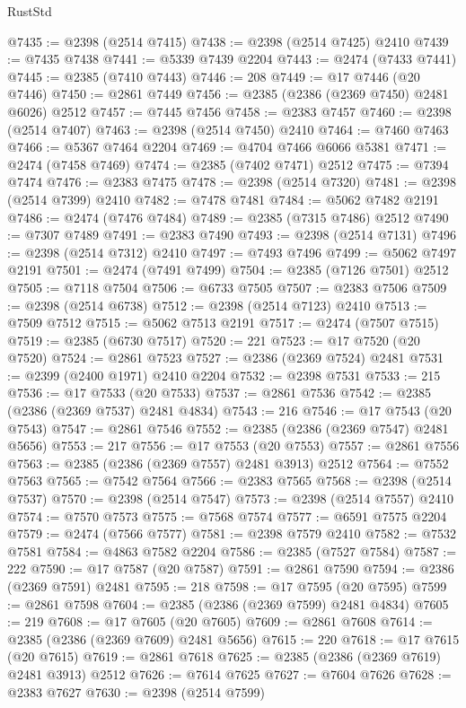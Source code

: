 \begin{lexlean}{RustStd}
\begin{coremodule}
@7435 := @2398 (@2514 @7415)
@7438 := @2398 (@2514 @7425) @2410
@7439 := @7435 @7438
@7441 := @5339 @7439 @2204
@7443 := @2474 (@7433 @7441)
@7445 := @2385 (@7410 @7443)
@7446 := 208
@7449 := @17 @7446 (@20 @7446)
@7450 := @2861 @7449
@7456 := @2385 (@2386 (@2369 @7450) @2481 @6026) @2512
@7457 := @7445 @7456
@7458 := @2383 @7457
@7460 := @2398 (@2514 @7407)
@7463 := @2398 (@2514 @7450) @2410
@7464 := @7460 @7463
@7466 := @5367 @7464 @2204
@7469 := @4704 @7466 @6066 @5381
@7471 := @2474 (@7458 @7469)
@7474 := @2385 (@7402 @7471) @2512
@7475 := @7394 @7474
@7476 := @2383 @7475
@7478 := @2398 (@2514 @7320)
@7481 := @2398 (@2514 @7399) @2410
@7482 := @7478 @7481
@7484 := @5062 @7482 @2191
@7486 := @2474 (@7476 @7484)
@7489 := @2385 (@7315 @7486) @2512
@7490 := @7307 @7489
@7491 := @2383 @7490
@7493 := @2398 (@2514 @7131)
@7496 := @2398 (@2514 @7312) @2410
@7497 := @7493 @7496
@7499 := @5062 @7497 @2191
@7501 := @2474 (@7491 @7499)
@7504 := @2385 (@7126 @7501) @2512
@7505 := @7118 @7504
@7506 := @6733 @7505
@7507 := @2383 @7506
@7509 := @2398 (@2514 @6738)
@7512 := @2398 (@2514 @7123) @2410
@7513 := @7509 @7512
@7515 := @5062 @7513 @2191
@7517 := @2474 (@7507 @7515)
@7519 := @2385 (@6730 @7517)
@7520 := 221
@7523 := @17 @7520 (@20 @7520)
@7524 := @2861 @7523
@7527 := @2386 (@2369 @7524) @2481
@7531 := @2399 (@2400 @1971) @2410 @2204
@7532 := @2398 @7531
@7533 := 215
@7536 := @17 @7533 (@20 @7533)
@7537 := @2861 @7536
@7542 := @2385 (@2386 (@2369 @7537) @2481 @4834)
@7543 := 216
@7546 := @17 @7543 (@20 @7543)
@7547 := @2861 @7546
@7552 := @2385 (@2386 (@2369 @7547) @2481 @5656)
@7553 := 217
@7556 := @17 @7553 (@20 @7553)
@7557 := @2861 @7556
@7563 := @2385 (@2386 (@2369 @7557) @2481 @3913) @2512
@7564 := @7552 @7563
@7565 := @7542 @7564
@7566 := @2383 @7565
@7568 := @2398 (@2514 @7537)
@7570 := @2398 (@2514 @7547)
@7573 := @2398 (@2514 @7557) @2410
@7574 := @7570 @7573
@7575 := @7568 @7574
@7577 := @6591 @7575 @2204
@7579 := @2474 (@7566 @7577)
@7581 := @2398 @7579 @2410
@7582 := @7532 @7581
@7584 := @4863 @7582 @2204
@7586 := @2385 (@7527 @7584)
@7587 := 222
@7590 := @17 @7587 (@20 @7587)
@7591 := @2861 @7590
@7594 := @2386 (@2369 @7591) @2481
@7595 := 218
@7598 := @17 @7595 (@20 @7595)
@7599 := @2861 @7598
@7604 := @2385 (@2386 (@2369 @7599) @2481 @4834)
@7605 := 219
@7608 := @17 @7605 (@20 @7605)
@7609 := @2861 @7608
@7614 := @2385 (@2386 (@2369 @7609) @2481 @5656)
@7615 := 220
@7618 := @17 @7615 (@20 @7615)
@7619 := @2861 @7618
@7625 := @2385 (@2386 (@2369 @7619) @2481 @3913) @2512
@7626 := @7614 @7625
@7627 := @7604 @7626
@7628 := @2383 @7627
@7630 := @2398 (@2514 @7599)

\end{coremodule}
\end{lexlean}
